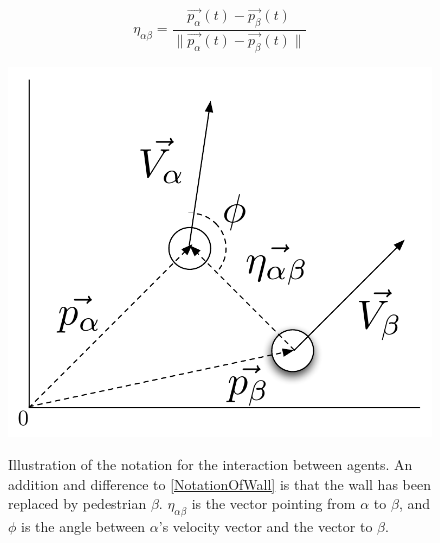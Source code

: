 \begin{equation}
    \eta_{\alpha \beta} =
        \frac{\overrightarrow{p_{\alpha}}(t) - \overrightarrow{p_{\beta}}(t)}
             {\|\overrightarrow{p_{\alpha}}(t) - \overrightarrow{p_{\beta}}(t) \|}
\end{equation}

\begin{figure}[ht]
    \centering
    {\includegraphics[scale=0.35]{Figures/NotationOfInteraction.pdf}} 
    \caption[Notation of the interaction between two agents]{Illustration of the notation for the interaction between agents.
	     An addition and difference to \ref{NotationOfWall} is that the wall has been replaced by pedestrian $\beta$.
	     $\eta_{\alpha \beta}$ is the vector pointing from $\alpha$ to $\beta$, and $\phi$ is the angle between $\alpha$'s 
	     velocity vector and the vector to $\beta$.}
    \label{fig:NotationOfInteraction}
\end{figure}



